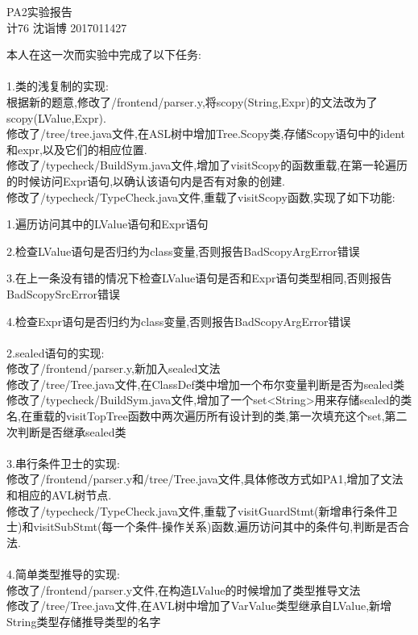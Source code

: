 \documentclass[UTF8]{ctexart}
\begin{document}
\begin{center}
PA2实验报告\\
计76 沈诣博 2017011427\\
\end{center}
本人在这一次而实验中完成了以下任务:\\\\
1.类的浅复制的实现:\\
根据新的题意,修改了/frontend/parser.y,将scopy(String,Expr)的文法改为了scopy(LValue,Expr).\\
修改了/tree/tree.java文件,在ASL树中增加Tree.Scopy类,存储Scopy语句中的ident和expr,以及它们的相应位置.\\
修改了/typecheck/BuildSym.java文件,增加了visitScopy的函数重载,在第一轮遍历的时候访问Expr语句,以确认该语句内是否有对象的创建.\\
修改了/typecheck/TypeCheck.java文件,重载了visitScopy函数,实现了如下功能:
\par 1.遍历访问其中的LValue语句和Expr语句
\par 2.检查LValue语句是否归约为class变量,否则报告BadScopyArgError错误
\par 3.在上一条没有错的情况下检查LValue语句是否和Expr语句类型相同,否则报告BadScopySrcError错误
\par 4.检查Expr语句是否归约为class变量,否则报告BadScopyArgError错误\\\\
2.sealed语句的实现:\\
修改了/frontend/parser.y,新加入sealed文法\\
修改了/tree/Tree.java文件,在ClassDef类中增加一个布尔变量判断是否为sealed类\\
修改了/typecheck/BuildSym.java文件,增加了一个set<String>用来存储sealed的类名,在重载的visitTopTree函数中两次遍历所有设计到的类,第一次填充这个set,第二次判断是否继承sealed类\\\\
3.串行条件卫士的实现:\\
修改了/frontend/parser.y和/tree/Tree.java文件,具体修改方式如PA1,增加了文法和相应的AVL树节点.\\
修改了/typecheck/TypeCheck.java文件,重载了visitGuardStmt(新增串行条件卫士)和visitSubStmt(每一个条件-操作关系)函数,遍历访问其中的条件句,判断是否合法.\\\\
4.简单类型推导的实现:\\
修改了/frontend/parser.y文件,在构造LValue的时候增加了类型推导文法\\
修改了/tree/Tree.java文件,在AVL树中增加了VarValue类型继承自LValue,新增String类型存储推导类型的名字\\
\end{document}
